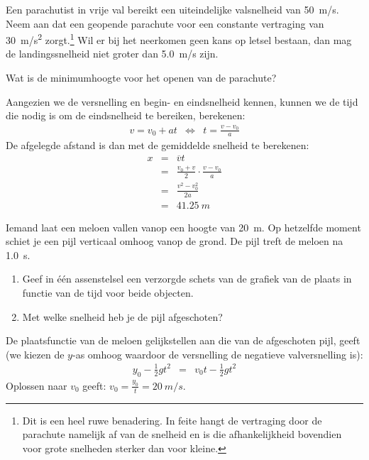 \documentclass{ximera}
\begin{document}
\begin{exercise}
    Een parachutist in vrije val bereikt een uiteindelijke valsnelheid van \SI{50}{m/s}. Neem aan dat een geopende parachute voor een constante vertraging van \SI{30}{m/s^2} zorgt.\footnote{Dit is een heel ruwe benadering. In feite hangt de vertraging door de parachute namelijk af van de snelheid en is die afhankelijkheid bovendien voor grote snelheden sterker dan voor kleine.} Wil er bij het neerkomen geen kans op letsel bestaan, dan mag de landingssnelheid niet groter dan \SI{5,0}{m/s} zijn.

    Wat is de minimumhoogte voor het openen van de parachute?
    \begin{oplossing}
        Aangezien we de versnelling en begin- en eindsnelheid kennen, kunnen we de tijd die nodig is om de eindsnelheid te bereiken, berekenen:
        \begin{eqnarray*}
            v=v_0+at&\Leftrightarrow&t=\frac{v-v_0}{a}
        \end{eqnarray*}
        De afgelegde afstand is dan met de gemiddelde snelheid te berekenen:
        \begin{eqnarray*}
            x&=&\overline{v}t\\
            &=&\frac{v_0+v}{2}\cdot\frac{v-v_0}{a}\\
            &=&\frac{v^2-v_0^2}{2a}\\
            &=&\SI{41,25}{m}
        \end{eqnarray*}
    \end{oplossing}
\end{exercise}

\begin{exercise}
    Iemand laat een meloen vallen vanop een hoogte van \SI{20}{m}. Op hetzelfde moment schiet je een pijl verticaal omhoog vanop de grond. De pijl treft de meloen na \SI{1,0}{s}. 
    \begin{enumerate}
        \item Geef in \'e\'en assenstelsel een verzorgde schets van de grafiek van de plaats in functie van de tijd voor beide objecten.
        \item Met welke snelheid heb je de pijl afgeschoten? 
    \end{enumerate}
    \begin{oplossing}
        De plaatsfunctie van de meloen gelijkstellen aan die van de afgeschoten pijl, geeft (we kiezen de $y$-as omhoog waardoor de versnelling de negatieve valversnelling is):
        \begin{eqnarray*}
           y_0-\frac{1}{2}gt^2&=&v_0t-\frac{1}{2}gt^2
        \end{eqnarray*}
        Oplossen naar $v_0$ geeft: $v_0=\frac{y_0}{t}=\SI{20}{m/s}$.
    \end{oplossing}
\end{exercise}
\end{document}
